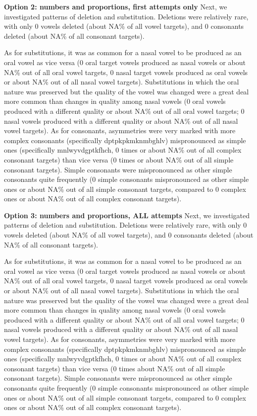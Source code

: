 \documentclass[english,,man,floatsintext]{apa6}
\begin{document}
\textbf{Option 2: numbers and proportions, first attempts only}
Next, we investigated patterns of deletion and substitution. Deletions were relatively rare, with only 0 vowels deleted (about NA\% of all vowel targets), and 0 consonants deleted (about NA\% of all consonant targets).

As for substitutions, it was as common for a nasal vowel to be produced as an oral vowel as vice versa (0 oral target vowels produced as nasal vowels or about NA\% out of all oral vowel targets, 0 nasal target vowels produced as oral vowels or about NA\% out of all nasal vowel targets). Substitutions in which the oral nature was preserved but the quality of the vowel was changed were a great deal more common than changes in quality among nasal vowels (0 oral vowels produced with a different quality or about NA\% out of all oral vowel targets; 0 nasal vowels produced with a different quality or about NA\% out of all nasal vowel targets). As for consonants, asymmetries were very marked with more complex consonants (specifically dptpkpkmknmbghlv) mispronounced as simple ones (specifically mnlwyvdgptkfhch, 0 times or about NA\% out of all complex consonant targets) than vice versa (0 times or about NA\% out of all simple consonant targets). Simple consonants were mispronounced as other simple consonants quite frequently (0 simple consonants mispronounced as other simple ones or about NA\% out of all simple consonant targets, compared to 0 complex ones or about NA\% out of all complex consonant targets).

\textbf{Option 3: numbers and proportions, ALL attempts}
Next, we investigated patterns of deletion and substitution. Deletions were relatively rare, with only 0 vowels deleted (about NA\% of all vowel targets), and 0 consonants deleted (about NA\% of all consonant targets).

As for substitutions, it was as common for a nasal vowel to be produced as an oral vowel as vice versa (0 oral target vowels produced as nasal vowels or about NA\% out of all oral vowel targets, 0 nasal target vowels produced as oral vowels or about NA\% out of all nasal vowel targets). Substitutions in which the oral nature was preserved but the quality of the vowel was changed were a great deal more common than changes in quality among nasal vowels (0 oral vowels produced with a different quality or about NA\% out of all oral vowel targets; 0 nasal vowels produced with a different quality or about NA\% out of all nasal vowel targets). As for consonants, asymmetries were very marked with more complex consonants (specifically dptpkpkmknmbghlv) mispronounced as simple ones (specifically mnlwyvdgptkfhch, 0 times or about NA\% out of all complex consonant targets) than vice versa (0 times about NA\% out of all simple consonant targets). Simple consonants were mispronounced as other simple consonants quite frequently (0 simple consonants mispronounced as other simple ones or about NA\% out of all simple consonant targets, compared to 0 complex ones or about NA\% out of all complex consonant targets).
\end{document}
